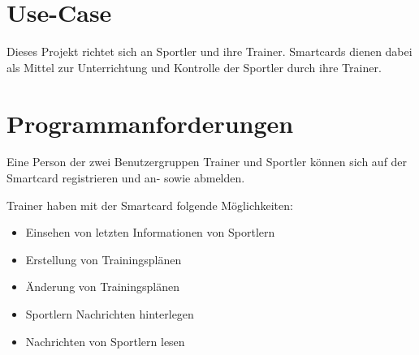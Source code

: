 \documentclass[a4paper,12pt]{article}
\begin{document}
\newpage
{}
\setcounter{page}{1} 



 
\clearpage
 
\onehalfspacing

\setlength{\parindent}{0pt}
\setlength{\parskip}{8pt}
 
 
\newpage
{}
\setcounter{page}{1} 



\section{Use-Case}
Dieses Projekt richtet sich an Sportler und ihre Trainer.
Smartcards dienen dabei als Mittel zur Unterrichtung und Kontrolle der Sportler durch ihre Trainer.\\


\section{Programmanforderungen}
Eine Person der zwei Benutzergruppen Trainer und Sportler können sich auf der Smartcard registrieren und an- sowie abmelden.

Trainer haben mit der Smartcard folgende Möglichkeiten:
\begin{itemize}
\item Einsehen von letzten Informationen von Sportlern
\item Erstellung von Trainingsplänen
\item Änderung von Trainingsplänen
\item Sportlern Nachrichten hinterlegen
\item Nachrichten von Sportlern lesen
\end{itemize}
\end{document}
